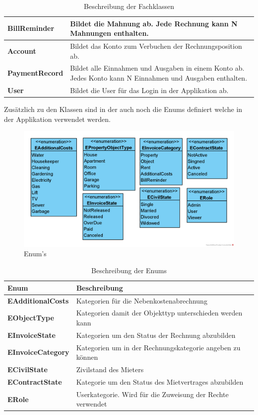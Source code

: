 \begin{table}[H]
\begin{tabulary}{1.0\textwidth}{|L|L|}
    \hline
    \textbf{BillReminder} & Bildet die Mahnung ab. Jede Rechnung kann N Mahnungen enthalten.\\
    \hline
    \textbf{Account} & Bildet das Konto zum Verbuchen der Rechnungsposition ab.\\
    \hline 
    \textbf{PaymentRecord} & Bildet alle Einnahmen und Ausgaben in einem Konto ab. Jedes Konto kann N Einnahmen und Ausgaben enthalten.\\
    \hline
    \textbf{User} & Bildet die User für das Login in der Applikation ab.\\
    \hline
\end{tabulary}
\caption{Beschreibung der Fachklassen}
\end{table}

\newpage
Zusätzlich zu den Klassen sind in der  auch noch die Enums definiert welche in der Applikation verwendet werden.

\begin{figure}[H]
  \begin{center}
    \includegraphics[width=0.65\linewidth]{content/diagrams/out/classdiagram/Enums.png}
    \caption{Enum's}
    \label{enums}
  \end{center}
\end{figure}

\begin{table}[H]
  \centering
  \settowidth{}
  \setlength\extrarowheight{2pt}
    \begin{tabulary}{1.0\textwidth}{|L|L|}
      \hline
      \textbf{Enum}& \textbf{Beschreibung}\\
    \hline
    \textbf{EAdditionalCosts} & Kategorien für die Nebenkostenabrechnung\\
    \hline
    \textbf{EObjectType} & Kategorien damit der Objekttyp unterschieden werden kann\\
    \hline
    \textbf{EInvoiceState} & Kategorien um den Status der Rechnung abzubilden\\
    \hline
    \textbf{EInvoiceCategory} & Kategorien um in der Rechnungskategorie angeben zu können\\
    \hline
    \textbf{ECivilState} & Zivilstand des Mieters\\
    \hline
    \textbf{EContractState} & Kategorie um den Status des Mietvertrages abzubilden\\
    \hline
    \textbf{ERole} & Userkategorie. Wird für die Zuweisung der Rechte verwendet\\
    \hline
\end{tabulary}
\caption{Beschreibung der Enums}
\end{table}

